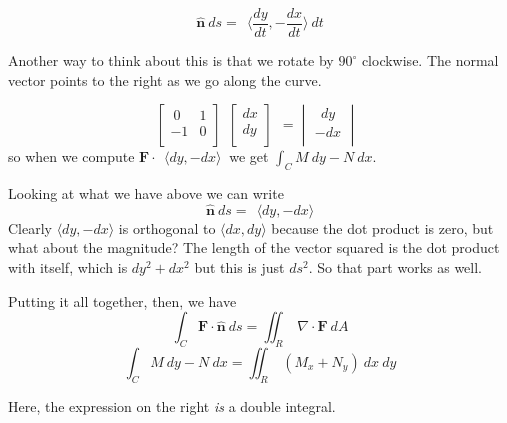\documentclass[11pt, oneside]{article}
\begin{document}
\[ \hat{\mathbf{n}} \ ds = \ \ \langle \frac{dy}{dt},-\frac{dx}{dt} \rangle \  dt \]

Another way to think about this is that we rotate by $90^{ \circ}$ clockwise.  The normal vector points to the right as we go along the curve.

\[
\begin{bmatrix} 
  \ 0  &  1 \\ 
  -1  &   0  \\ 
\end{bmatrix} \ \ 
\begin{bmatrix} 
  dx  \\ 
  dy  \\ 
\end{bmatrix} \ \ 
=
\begin{vmatrix} 
  \ \ dy  \\ 
  -dx  \\ 
\end{vmatrix} \ \ 
\]
so when we compute $\mathbf{F} \cdot \ \ \langle dy,-dx \rangle \ $ we get $\int_C M \ dy - N \ dx$.  

Looking at what we have above we can write
\[ \hat{\mathbf{n}} \ ds = \ \ \langle dy, -dx \rangle \]
Clearly $\langle dy, -dx \rangle$ is orthogonal to $\langle dx, dy \rangle$ because the dot product is zero, but what about the magnitude?  The length of the vector squared is the dot product with itself, which is $dy^2 + dx^2$ but this is just $ds^2$.  So that part works as well.

Putting it all together, then, we have
\[ \int_C \mathbf{F} \cdot \hat{\mathbf{n}} \  ds =  \iint_R \ \nabla \cdot \mathbf{F} \ dA  \]
\[ \int_C M \ dy - N \ dx =  \iint_R \ (M_x + N_y) \ dx \ dy \]

Here, the expression on the right \emph{is} a double integral.
\end{document}

